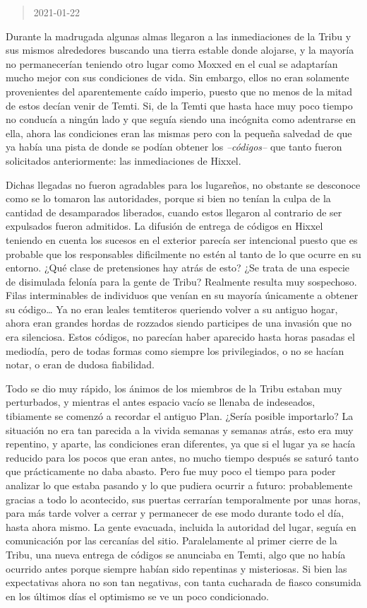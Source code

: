 \documentclass[
  spanish,
]{book}
\begin{document}
\begin{quote}
2021-01-22
\end{quote}

Durante la madrugada algunas almas llegaron a las inmediaciones de la Tribu y sus mismos alrededores buscando una tierra estable donde alojarse, y la mayoría no permanecerían teniendo otro lugar como Moxxed en el cual se adaptarían mucho mejor con sus condiciones de vida. Sin embargo, ellos no eran solamente provenientes del aparentemente caído imperio, puesto que no menos de la mitad de estos decían venir de Temti. Si, de la Temti que hasta hace muy poco tiempo no conducía a ningún lado y que seguía siendo una incógnita como adentrarse en ella, ahora las condiciones eran las mismas pero con la pequeña salvedad de que ya había una pista de donde se podían obtener los \emph{--códigos--} que tanto fueron solicitados anteriormente: las inmediaciones de Hixxel.

Dichas llegadas no fueron agradables para los lugareños, no obstante se desconoce como se lo tomaron las autoridades, porque si bien no tenían la culpa de la cantidad de desamparados liberados, cuando estos llegaron al contrario de ser expulsados fueron admitidos. La difusión de entrega de códigos en Hixxel teniendo en cuenta los sucesos en el exterior parecía ser intencional puesto que es probable que los responsables dificilmente no estén al tanto de lo que ocurre en su entorno. ¿Qué clase de pretensiones hay atrás de esto? ¿Se trata de una especie de disimulada felonía para la gente de Tribu?
Realmente resulta muy sospechoso.
Filas interminables de individuos que venían en su mayoría únicamente a obtener su código\ldots{} Ya no eran leales temtiteros queriendo volver a su antiguo hogar, ahora eran grandes hordas de rozzados siendo participes de una invasión que no era silenciosa.
Estos códigos, no parecían haber aparecido hasta horas pasadas el mediodía, pero de todas formas como siempre los privilegiados, o no se hacían notar, o eran de dudosa fiabilidad.

Todo se dio muy rápido, los ánimos de los miembros de la Tribu estaban muy perturbados, y mientras el antes espacio vacío se llenaba de indeseados, tibiamente se comenzó a recordar el antiguo Plan. ¿Sería posible importarlo?
La situación no era tan parecida a la vivida semanas y semanas atrás, esto era muy repentino, y aparte, las condiciones eran diferentes, ya que si el lugar ya se hacía reducido para los pocos que eran antes, no mucho tiempo después se saturó tanto que prácticamente no daba abasto. Pero fue muy poco el tiempo para poder analizar lo que estaba pasando y lo que pudiera ocurrir a futuro: probablemente gracias a todo lo acontecido, sus puertas cerrarían temporalmente por unas horas, para más tarde volver a cerrar y permanecer de ese modo durante todo el día, hasta ahora mismo. La gente evacuada, incluida la autoridad del lugar, seguía en comunicación por las cercanías del sitio.
Paralelamente al primer cierre de la Tribu, una nueva entrega de códigos se anunciaba en Temti, algo que no había ocurrido antes porque siempre habían sido repentinas y misteriosas. Si bien las expectativas ahora no son tan negativas, con tanta cucharada de fiasco consumida en los últimos días el optimismo se ve un poco condicionado.
\end{document}
